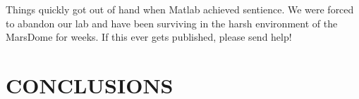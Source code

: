 \documentclass[letterpaper, 10 pt, conference]{ieeeconf}  %
\begin{document}
Things quickly got out of hand when Matlab achieved sentience. 
We were forced to abandon our lab and have been surviving in the harsh environment of the MarsDome for weeks.
If this ever gets published, please send help!





\section{CONCLUSIONS} \label{sec:conclusions}


\def\url#1{} %


\end{document}

